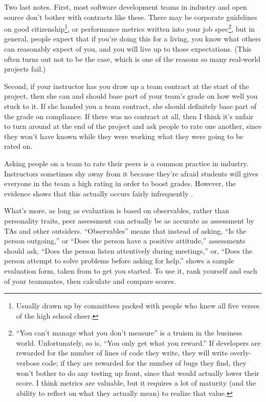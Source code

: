 \documentclass{report}
\begin{document}
Two last notes.  First, most software development teams in industry
and open source don't bother with contracts like these.  There may be
corporate guidelines on good citizenship\footnote{Usually drawn up by
committees packed with people who knew all five verses of the high
school cheer.}, or performance metrics written into your job
spec\footnote{``You can't manage what you don't measure'' is a truism
in the business world.  Unfortunately, so is, ``You only get what you
reward.''  If developers are rewarded for the number of lines of code
they write, they will write overly-verbose code; if they are rewarded
for the number of bugs they find, they won't bother to do any testing
up front, since that would actually lower their score.  I think
metrics are valuable, but it requires a lot of maturity (and the
ability to reflect on what they actually mean) to realize that
value.}, but in general, people expect that if you're doing this for a
living, you know what others can reasonably expect of you, and you
will live up to those expectations.  (This often turns out not to be
the case, which is one of the reasons so many real-world projects
fail.)

Second, if your instructor has you draw up a team contract at the
start of the project, then she can and should base part of your team's
grade on how well you stuck to it.  If she handed you a team contract,
she should definitely base part of the grade on compliance.  If there
was no contract at all, then I think it's unfair to turn around at the
end of the project and ask people to rate one another, since they
won't have known while they were working what they were going to be
rated on.

Asking people on a team to rate their peers is a common practice in
industry.  Instructors sometimes shy away from it because they're
afraid students will gives everyone in the team a high rating in order
to boost grades.  However, the evidence shows that this actually
occurs fairly infrequently \cite{b:kaufman-felder-accounting}.

What's more, as long as evaluation is based on observables, rather
than personality traits, peer assessment can actually be as accurate
as assessment by TAs and other outsiders.  ``Observables'' means that
instead of asking, ``Is the person outgoing,'' or ``Does the person
have a positive attitude,'' assessments should ask, ``Does the person
listen attentively during meetings,'' or, ``Does the person attempt to
solve problems before asking for help.''   shows a
sample evaluation form, taken from \cite{b:seat-mcanear-team} to get
you started.  To use it, rank yourself and each of your teammates,
then calculate and compare scores.
\end{document}
